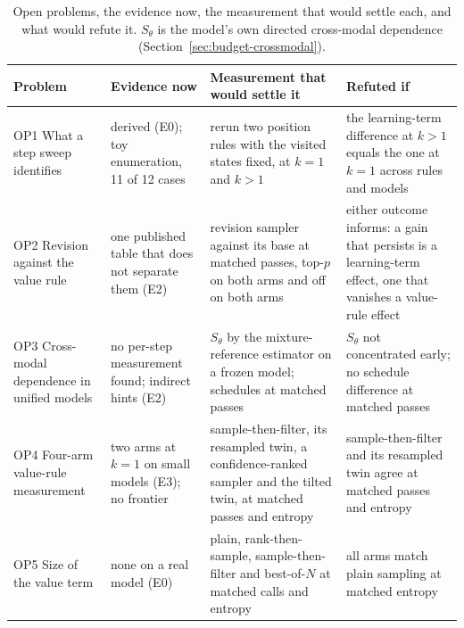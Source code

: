 \begin{table}[t]
\caption{Open problems, the evidence now, the measurement that would settle each, and what would refute it. $S_\theta$ is the model's own directed cross-modal dependence (Section~\ref{sec:budget-crossmodal}).}
\label{tab:open}
\footnotesize
\begin{tabular}{@{}p{2.2cm}p{3.0cm}p{3.6cm}p{3.2cm}@{}}
\toprule
Problem & Evidence now & Measurement that would settle it & Refuted if \\
\midrule
OP1 What a step sweep identifies & derived (E0); toy enumeration, 11 of 12 cases & rerun two position rules with the visited states fixed, at $k=1$ and $k>1$ & the learning-term difference at $k>1$ equals the one at $k=1$ across rules and models \\
OP2 Revision against the value rule & one published table that does not separate them (E2) & revision sampler against its base at matched passes, top-$p$ on both arms and off on both arms & either outcome informs: a gain that persists is a learning-term effect, one that vanishes a value-rule effect \\
OP3 Cross-modal dependence in unified models & no per-step measurement found; indirect hints (E2) & $S_\theta$ by the mixture-reference estimator on a frozen model; schedules at matched passes & $S_\theta$ not concentrated early; no schedule difference at matched passes \\
OP4 Four-arm value-rule measurement & two arms at $k=1$ on small models (E3); no frontier & sample-then-filter, its resampled twin, a confidence-ranked sampler and the tilted twin, at matched passes and entropy & sample-then-filter and its resampled twin agree at matched passes and entropy \\
OP5 Size of the value term & none on a real model (E0) & plain, rank-then-sample, sample-then-filter and best-of-$N$ at matched calls and entropy & all arms match plain sampling at matched entropy \\
\bottomrule
\end{tabular}
\end{table}

